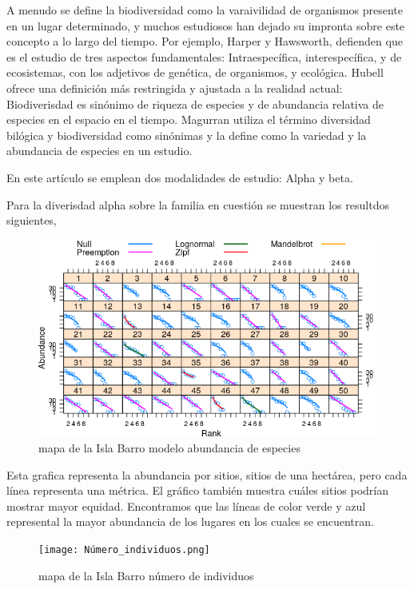 \documentclass[11pt,]{article}
\begin{document}
A menudo se define la biodiversidad como la varaivilidad de organismos
presente en un lugar determinado, y muchos estudiosos han dejado su
impronta sobre este concepto a lo largo del tiempo. Por ejemplo, Harper
y Hawsworth, defienden que es el estudio de tres aspectos fundamentales:
Intraespecífica, interespecífica, y de ecosistemas, con los adjetivos de
genética, de organismos, y ecológica. Hubell ofrece una definición más
restringida y ajustada a la realidad actual: Biodiverisdad es sinónimo
de riqueza de especies y de abundancia relativa de especies en el
espacio en el tiempo. Magurran utiliza el término diversidad bilógica y
biodiversidad como sinónimas y la define como la variedad y la
abundancia de especies en un estudio.

En este artículo se emplean dos modalidades de estudio: Alpha y beta.

Para la diverisdad alpha sobre la familia en cuestión se muestran los
resultdos siguientes,

\begin{figure}
\centering
\includegraphics[width=1.00000\textwidth]{modelo_abundancia_especie.png}
\caption{mapa de la Isla Barro modelo abundancia de especies
\label{fig:bci_map}}
\end{figure}

Esta grafica representa la abundancia por sitios, sitios de una
hectárea, pero cada línea representa una métrica. El gráfico también
muestra cuáles sitios podrían mostrar mayor equidad. Encontramos que las
líneas de color verde y azul represental la mayor abundancia de los
lugares en los cuales se encuentran.

\begin{figure}
\centering
\texttt{[image: Número\_individuos.png]}
\caption{mapa de la Isla Barro número de individuos \label{fig:bci_map}}
\end{figure}
\end{document}
